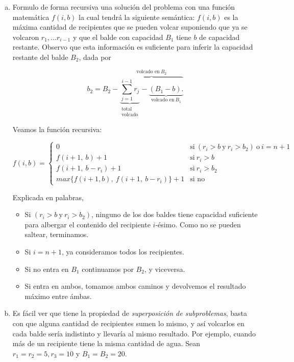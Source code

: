 \documentclass[12pt, a4paper]{report}
\theoremstyle{definition} %
\begin{document}
\begin{enumerate}[a)]
    \item Formulo de forma recursiva una solución del problema con una función matemática $f(i, b)$ la cual tendrá la siguiente semántica: $f(i, b)$ es la máxima cantidad de recipientes que se pueden volcar suponiendo que ya se volcaron $r_1, ... r_{i-1}$ y que el balde con capacidad $B_1$ tiene $b$ de capacidad restante. Observo que esta información es suficiente para inferir la capacidad restante del balde $B_2$, dada por 
    
    \[ 
        b_2 = B_2 -
            \overbrace{
            \underbrace{\sum_{j=1}^{i-1} r_j}_{\substack{\text{total}\\\text{volcado}}} - 
            \underbrace{(B_1 - b).}_{\text{volcado en} \ B_1}
            }^{\text{volcado en} \ B_2}
    \]

    Veamos la función recursiva:

    \[ 
        f(i, b) =
            \begin{cases}
                0 & \text{si} \ (r_i > b \ \text{y}\  r_i > b_2) \ \text{o} \ i = n+1 \\
                f(i+1,\ b) + 1 &\text{si}\ r_i > b\\
                f(i+1,\ b - r_i) + 1 &\text{si}\ r_i > b_2\\
                max\{f(i+1, b),\ f(i+1,\ b - r_i)\} + 1 &\text{si no}
            \end{cases}
    \]

    Explicada en palabras,

    \begin{itemize}
        \item Si $(r_i > b \ \text{y}\  r_i > b_2)$, ninguno de los dos baldes tiene capacidad suficiente para albergar el contenido del recipiente $i$-ésimo. Como no se pueden saltear, terminamos.
        \item Si $i = n + 1$, ya consideramos todos los recipientes.
        \item Si no entra en $B_1$ continuamos por $B_2$, y viceversa.
        \item Si entra en ambos, tomamos ambos caminos y devolvemos el resultado máximo entre ámbas.
    \end{itemize}

    \item Es fácil ver que tiene la propiedad de \textit{superposición de subproblemas}, basta con que alguna cantidad de recipientes sumen lo mismo, y así volcarlos en cada balde sería indistinto y llevaría al mismo resultado. Por ejemplo, cuando más de un recipiente tiene la misma cantidad de agua. Sean $r_1 = r_2 = 5, r_3 = 10$ y $B_1 = B_2 = 20$.
    

\end{enumerate}
\end{document}
